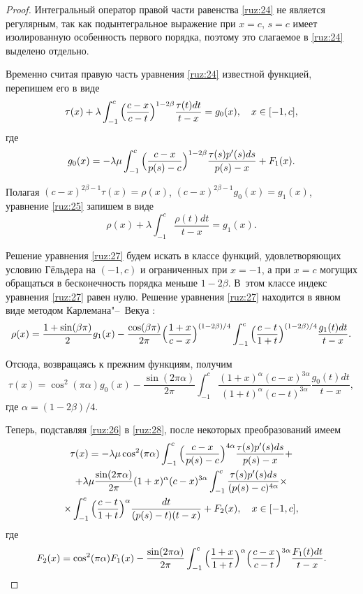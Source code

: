 \begin{proof}
Интегральный оператор правой части равенства \eqref{ruz:24} не является регулярным,
так как подынтегральное выражение при $x=c$, $s=c$ имеет изолированную
особенность первого порядка, поэтому это слагаемое в \eqref{ruz:24} выделено отдельно.

Временно считая правую часть уравнения \eqref{ruz:24} известной функцией,
перепишем его в виде
\begin{equation}
\tau(x)+\lambda\int_{-1}^c{\Bigl(\frac{c-x}{c-t}\Bigr)^{1-2\beta}\frac{\tau(t)dt}{t-x}}=g_0(x), \quad x\in[-1, c],
\label{ruz:25}
\end{equation}
где
\begin{equation}
g_0(x)=-\lambda\mu\int_{-1}^c{\Bigl(\frac{c-x}{p(s)-c}\Bigr)^{1-2\beta}\frac{\tau(s)p'(s)ds}{p(s)-x}}+F_1(x).
\label{ruz:26}
\end{equation}

Полагая $(c-x)^{2\beta-1}\tau(x)=\rho(x)$, $(c-x)^{2\beta-1}g_0(x)=g_1(x)$,
уравнение \eqref{ruz:25} запишем в виде
\begin{equation}
\rho(x)+\lambda\int_{-1}^c{\frac{\rho(t)dt}{t-x}}=g_1(x).
\label{ruz:27}
\end{equation}

Решение уравнения \eqref{ruz:27} будем искать в классе функций, удовлетворяющих
условию Гёльдера на  $(-1, c)$ и ограниченных при $x=-1$,
а при $x=c$ могущих обращаться в бесконечность порядка меньше $1-2\beta$. 
В~этом классе индекс уравнения \eqref{ruz:27}
равен нулю.  Решение уравнения \eqref{ruz:27} находится в явном виде методом Карлемана"--~Векуа \cite{ruz:bib:11}:
$$\rho(x)=\frac{1+\sin(\beta\pi)}{2}g_1(x)-
\frac{\cos(\beta\pi)}{2\pi}\Bigl(\frac{1+x}{c-x}\Bigr)^{(1-2\beta)/4}\int_{-1}^c{\Bigl(\frac{c-t}{1+t}\Bigr)^{(1-2\beta)/4}\frac{g_1(t)dt}{t-x}}.$$

Отсюда, возвращаясь к прежним функциям, получим
\begin{equation}
\tau(x)=\cos^2(\pi\alpha)g_0(x)-\frac{\sin(2\pi\alpha)}{2\pi}\int_{-1}^c{\frac{(1+x)^\alpha(c-x)^{3\alpha}}{(1+t)^\alpha(c-t)^{3\alpha}}\frac{g_0(t)dt}{t-x}},
\label{ruz:28}
\end{equation}
где $\alpha=(1-2\beta)/4$.

Теперь, подставляя \eqref{ruz:26} в \eqref{ruz:28}, после некоторых преобразований имеем
\begin{multline}
\tau(x)=-\lambda\mu\cos^2(\pi\alpha)\int_{-1}^c{\Bigl(\frac{c-x}{p(s)-c}\Bigr)^{4\alpha}\frac{\tau(s)p'(s)ds}{p(s)-x}}+
\\
+\lambda\mu\frac{\sin(2\pi\alpha)}{2\pi}(1+x)^\alpha(c-x)^{3\alpha}\int_{-1}^c{\frac{\tau(s)p'(s)ds}{(p(s)-c)^{4\alpha}}}\times
\\
\times\int_{-1}^c{\Bigl(\frac{c-t}{1+t}\Bigr)^\alpha\frac{dt}{(p(s)-t)(t-x)}}+F_2(x), \quad x\in[-1, c],
\label{ruz:29}
\end{multline}
где
$$
F_2(x)=\cos^2(\pi\alpha)F_1(x)-\frac{\sin(2\pi\alpha)}{2\pi}\int_{-1}^c{\Bigl(\frac{1+x}{1+t}\Bigr)^\alpha
\Bigl(\frac{c-x}{c-t}\Bigr)^{3\alpha}\frac{F_1(t)dt}{t-x}}.
$$


\end{proof}

